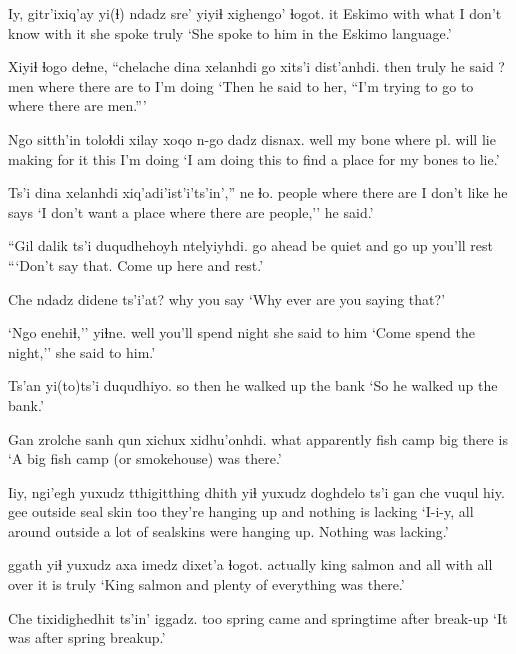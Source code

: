 \documentclass[12pt]{article}
\begin{document}
\gll Iy, gitr'ixiq'ay yi(ɬ) ndadz sre' yiyiɬ xighengo' ɬogot. 
it Eskimo with what {I don't know} {with it} {she spoke} truly
\glt `She spoke to him in the Eskimo language.' 
\glend

\gll Xiyiɬ ɬogo deɬne, ``chelache dina xelanhdi go xits'i dist'anhdi. 
then truly {he said} ? men {where there are} {} to {I'm doing}
\glt `Then he said to her, ``I'm trying to go to where there are men.''' 
\glend

\gll Ngo sitth'in toloɬdi xilay xoqo {n-go dadz} disnax. 
well {my bone} {where pl. will lie} making {for it} this {I'm doing}
\glt `I am doing this to find a place for my bones to lie.' 
\glend

\gll Ts'i dina xelanhdi {xiq'adi'ist'i'ts'in'},'' ne ɬo. 
{} people {where there are} {I don't like} {he says}
\glt `I don't want a place where there are people,'' he said.' 
\glend

\gll ``Gil dalik ts'i duqudhehoyh ntelyiyhdi.
{go ahead} {be quiet} and {go up} {you'll rest}
\glt ```Don't say that. Come up here and rest.' 
\glend

\gll Che ndadz didene ts'i'at? 
{} why {you say} {}
\glt `Why ever are you saying that?' 
\glend

\gll `Ngo enehiɬ,'' yiɬne. 
well {you'll spend night} {she said to him}
\glt `Come spend the night,'' she said to him.' 
\glend

\gll Ts'an yi(to)ts'i duqudhiyo. 
so then {he walked up the bank}
\glt `So he walked up the bank.' 
\glend

\gll Gan zrolche {sanh qun} xichux xidhu'onhdi. 
what apparently {fish camp} big {there is}
\glt `A big fish camp (or smokehouse) was there.' 
\glend

\gll Iiy, ngi'egh yuxudz tthigitthing dhith yiɬ yuxudz doghdelo ts'i {gan che vuqul hiy.} 
gee outside {} seal skin too {} {they're hanging up} and {nothing is lacking}
\glt `I-i-y, all around outside a lot of sealskins were hanging up. Nothing was lacking.' 
\glend

 ggath yiɬ yuxudz axa imedz dixet'a ɬogot. 
actually {king salmon} and all with {all over} {it is} truly
\glt `King salmon and plenty of everything was there.' 
\glend

\gll Che tixidighedhit ts'in' iggadz. 
too {spring came} and {springtime after break-up}
\glt `It was after spring breakup.' 
\glend
\end{document}
